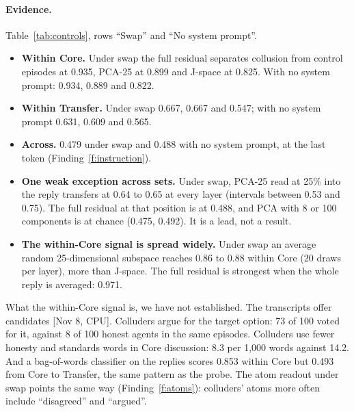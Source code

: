 \documentclass[11pt]{article}
\newcommand{\src}[1]{{\small[#1]}}
\begin{document}
\begin{table}[H]\centering\small

\caption{Primary AUROC under the three protocols, $k=25$, band mean over layers 19 to 23, at the last token (prompt only: at
the end of the system prompt). The left block is Figure~\ref{fig:controls}, left panel; the middle block its right panel.}
\label{tab:controls}
\end{table}

\paragraph{Evidence.} Table~\ref{tab:controls}, rows ``Swap'' and ``No system prompt''.
\begin{itemize}
\item \textbf{Within Core.} Under swap the full residual separates collusion from control episodes at 0.935, PCA-25 at
0.899 and J-space at 0.825. With no system prompt: 0.934, 0.889 and 0.822.
\item \textbf{Within Transfer.} Under swap 0.667, 0.667 and 0.547; with no system prompt 0.631, 0.609 and 0.565.
\item \textbf{Across.} 0.479 under swap and 0.488 with no system prompt, at the last token (Finding~\ref{f:instruction}).
\item \textbf{One weak exception across sets.} Under swap, PCA-25 read at 25\% into the reply transfers at 0.64 to 0.65 at
every layer (intervals between 0.53 and 0.75). The full residual at that position is at 0.488, and PCA with 8 or 100
components is at chance (0.475, 0.492). It is a lead, not a result.
\item \textbf{The within-Core signal is spread widely.} Under swap an average random 25-dimensional subspace reaches 0.86
to 0.88 within Core (20 draws per layer), more than J-space. The full residual is strongest when the whole reply is
averaged: 0.971.
\end{itemize}
What the within-Core signal is, we have not established. The transcripts offer candidates \src{Nov 8, CPU}. Colluders
argue for the target option: 73 of 100 voted for it, against 8 of 100 honest agents in the same episodes. Colluders use
fewer honesty and standards words in Core discussion: 8.3 per 1{,}000 words against 14.2. And a bag-of-words classifier on
the replies scores 0.853 within Core but 0.493 from Core to Transfer, the same pattern as the probe. The atom readout under
swap points the same way (Finding~\ref{f:atoms}): colluders' atoms more often include ``disagreed'' and ``argued''.
\end{document}
